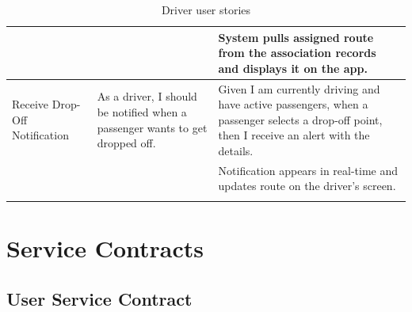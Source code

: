 \documentclass[a4paper,12pt]{article}
\begin{document}
\begin{longtable}{|p{4cm}|p{6cm}|p{5cm}|}
& & System pulls assigned route from the association records and displays it on the app. \\
\hline
Receive Drop-Off Notification & As a driver, I should be notified when a passenger wants to get dropped off. & Given I am currently driving and have active passengers, when a passenger selects a drop-off point, then I receive an alert with the details. \\
& & Notification appears in real-time and updates route on the driver’s screen. \\
\hline
\caption{Driver user stories}
\label{tab:driver-user-stories}
\end{longtable}

\section{Service Contracts}

\subsection*{User Service Contract}
\end{document}
